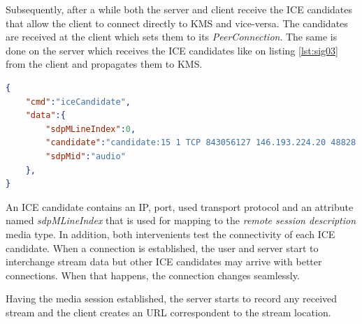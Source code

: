 Subsequently, after a while both the server and client receive the \ac{ICE} candidates that allow the client to connect directly to \ac{KMS} and vice-versa. The candidates are received at the client which sets them to its \emph{PeerConnection}. The same is done on the server which receives the \ac{ICE} candidates like on listing \ref{lst:sig03} from the client and propagates them to \ac{KMS}.

\begin{minipage}{\linewidth}
\begin{lstlisting}[caption={ICE candidates sent by KMS and client},label={lst:sig03},language=json]
{
	"cmd":"iceCandidate",
	"data":{
		"sdpMLineIndex":0,
		"candidate":"candidate:15 1 TCP 843056127 146.193.224.20 48828 typ srflx raddr 192.168.1.105 rport 48828 tcptype passive",
		"sdpMid":"audio"
	},
}
\end{lstlisting}
\end{minipage}

An \ac{ICE} candidate contains an \ac{IP}, port, used transport protocol and an attribute named \emph{sdpMLineIndex} that is used for mapping to the \emph{remote session description} media type.
In addition, both intervenients test the connectivity of each \ac{ICE} candidate. When a connection is established, the user and server start to interchange stream data but other \ac{ICE} candidates may arrive with better connections. When that happens, the connection changes seamlessly. 

Having the media session established, the server starts to record any received stream and the client creates an \ac{URL} correspondent to the stream location.

